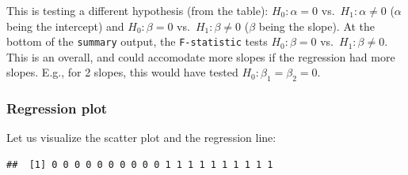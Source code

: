 \documentclass[
]{book}
\newenvironment{Shaded}{\begin{snugshade}}{\end{snugshade}}
\newcommand{\CommentTok}[1]{\textcolor[rgb]{0.56,0.35,0.01}{\textit{#1}}}
\newcommand{\DataTypeTok}[1]{\textcolor[rgb]{0.13,0.29,0.53}{#1}}
\newcommand{\DecValTok}[1]{\textcolor[rgb]{0.00,0.00,0.81}{#1}}
\newcommand{\KeywordTok}[1]{\textcolor[rgb]{0.13,0.29,0.53}{\textbf{#1}}}
\newcommand{\NormalTok}[1]{#1}
\newcommand{\OperatorTok}[1]{\textcolor[rgb]{0.81,0.36,0.00}{\textbf{#1}}}
\newcommand{\OtherTok}[1]{\textcolor[rgb]{0.56,0.35,0.01}{#1}}
\newcommand{\StringTok}[1]{\textcolor[rgb]{0.31,0.60,0.02}{#1}}
\begin{document}
This is testing a different hypothesis (from the table): \(H_0: \alpha = 0\) vs.~\(H_1: \alpha \ne 0\) (\(\alpha\) being the intercept) and \(H_0: \beta = 0\) vs.~\(H_1: \beta \ne 0\) (\(\beta\) being the slope). At the bottom of the \texttt{summary} output, the \texttt{F-statistic} tests \(H_0: \beta = 0\) vs.~\(H_1: \beta \ne 0\). This is an overall, and could accomodate more slopes if the regression had more slopes. E.g., for 2 slopes, this would have tested \(H_0: \beta_1 = \beta_2 = 0\).

\hypertarget{regression-plot}{%
\subsubsection{Regression plot}\label{regression-plot}}

Let us visualize the scatter plot and the regression line:

\begin{Shaded}
\end{Shaded}

\begin{verbatim}
##  [1] 0 0 0 0 0 0 0 0 0 0 1 1 1 1 1 1 1 1 1 1
\end{verbatim}

\begin{Shaded}
\end{Shaded}
\end{document}
